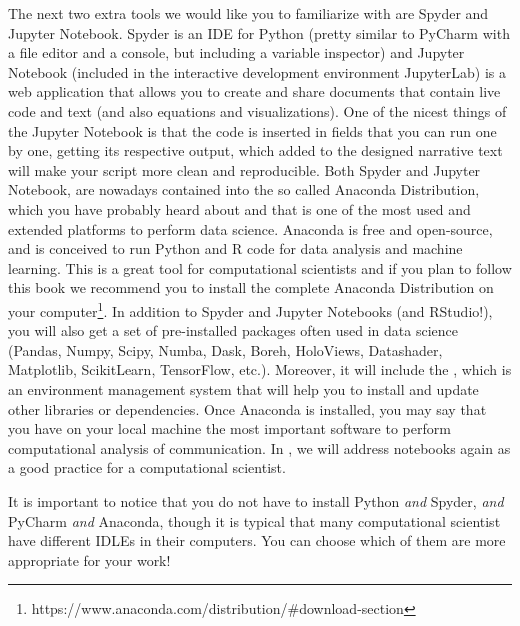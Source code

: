 The next two extra tools we would like you to familiarize with are
Spyder and Jupyter Notebook. Spyder is an IDE for Python (pretty
similar to PyCharm with a file editor and a console, but including a
variable inspector) and Jupyter Notebook (included in the interactive
development environment JupyterLab) is a web application that allows
you to create and share documents that contain live code and text (and
also equations and visualizations).  One of the nicest things of the
Jupyter Notebook is that the code is inserted in fields that you can
run one by one, getting its respective output, which added to the
designed narrative text will make your script more clean and
reproducible. Both Spyder and Jupyter Notebook, are nowadays
contained into the so called Anaconda Distribution, which you have
probably heard about and that is one of the most used and extended
platforms to perform data science. Anaconda is free and open-source,
and is conceived to run Python and R code for data analysis and
machine learning. This is a great tool for computational scientists
and if you plan to follow this book we recommend you to install the
complete Anaconda Distribution on your
computer\footnote{https://www.anaconda.com/distribution/\#download-section}. In
addition to Spyder and Jupyter Notebooks (and RStudio!), you will also
get a set of pre-installed packages often used in data science
(Pandas, Numpy, Scipy, Numba, Dask, Boreh, HoloViews, Datashader,
Matplotlib, ScikitLearn, TensorFlow, etc.). Moreover, it will include
the , which is an environment management system
that will help you to install and update other libraries or
dependencies. Once Anaconda is installed, you may say that you have on
your local machine the most important software to perform
computational analysis of communication. In , we will address notebooks again as a good practice for a computational
scientist.

It is important to notice that you do not have to install Python \textit{and} Spyder, \textit{and} PyCharm \textit{and} Anaconda, though it is typical that many computational scientist have different IDLEs in their computers. You can choose which of them are more appropriate for your work!
